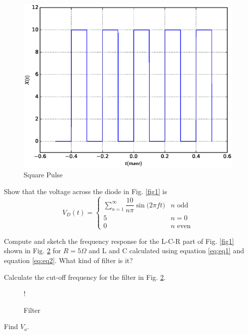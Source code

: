 \documentclass[journal,12pt,twocolumn]{IEEEtran}
\begin{document}
\begin{figure}[h]
	\includegraphics[scale=0.5]{./figs/square.eps}
	\caption{Square Pulse} \label{fig5}
    \end{figure}
\begin{problem}
Show that the voltage across the diode in Fig. \ref{fig1} is
%
\begin{equation}
V_D(t) =
\begin{cases}
  \sum_{n=1}^{\infty} \dfrac{10}{n \pi} \sin \Big (2\pi ft \Big ) & n \text{ odd}
 \\
 5   & n = 0
 \\
 0 & n \text{ even}
 \end{cases}
\end{equation}

\end{problem}
\begin{problem}
Compute  and sketch the frequency response for the L-C-R part of Fig. \ref{fig1} shown in Fig. \ref{fig6} for $R = 5 \Omega$ and L and C calculated using  equation \eqref{eq:eq1} and  equation \eqref{eq:eq2}. What kind of filter is it?
\end{problem}
\begin{problem}
Calculate the cut-off frequency for the filter in Fig. \ref{fig6}.  
\label{prob}
\end{problem}
\begin{figure}
       \centering  
       \resizebox {\columnwidth} {!} {

}
    \caption{Filter} \label{fig6}
   \end{figure}
   \begin{problem}
   Find $V_{o}$. 
   \end{problem}
 
\end{document}
